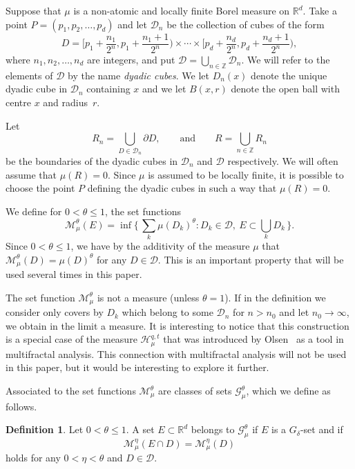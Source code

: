 \documentclass[10pt]{amsart}
\theoremstyle{definition}\newtheorem{defi}[theo]{Definition}\newtheorem{rema}[theo]{Remark}\newtheorem{exam}[theo]{Example}\newtheorem{exem}[theo]{Example}\newtheorem{nota}[theo]{Notation}
\begin{document}
Suppose that $\mu$ is a non-atomic and locally finite Borel measure on $\mathbb{R}^d$. Take a point $P = (p_1, p_2, \ldots, p_d)$ and let $\mathscr{D}_n$ be the collection of cubes of the form
\[
D = \biggl[p_1 + \frac{n_1}{2^n}, p_1 + \frac{n_1 + 1}{2^n} \biggr)
\times \cdots \times \biggl[p_d + \frac{n_d}{2^n}, p_d + \frac{n_d + 1}{2^n} \biggr),
\]
where $n_1, n_2, \ldots, n_d$ are integers, and put $\mathscr{D} =
\bigcup_{n \in \mathbb{Z}} \mathscr{D}_n$. We will refer to the elements of $\mathscr{D}$ by the name {\em dyadic cubes}. We let $D_n (x)$ denote the unique dyadic cube in $\mathscr{D}_n$ containing $x$ and we let $B(x,r)$ denote the open ball with centre $x$ and radius~$r$.

Let
\[
R_n = \bigcup_{D \in \mathscr{D}_n} \partial D, \qquad \text{and} \qquad R = \bigcup_{n \in \mathbb{Z}} R_n
\]
be the boundaries of the dyadic cubes in $\mathscr{D}_n$ and $\mathscr{D}$ respectively. We will often assume that $\mu (R) = 0$. Since $\mu$ is assumed to be locally finite, it is possible to choose the point $P$ defining the dyadic cubes in such a way that $\mu (R) = 0$.

We define for $0 < \theta \leq 1$, the set functions
\[
\mathscr{M}_\mu^\theta (E) = \inf \biggl\{\, \sum_k \mu (D_k)^\theta : D_k \in \mathscr{D},\ E \subset \bigcup_k D_k \,\biggr\}.
\]
Since $0 < \theta \leq 1$, we have by the additivity of the measure $\mu$ that $\mathscr{M}_\mu^\theta (D) = \mu (D)^\theta$ for any $D
\in \mathscr{D}$. This is an important property that will be used several times in this paper.

The set function $\mathscr{M}_\mu^\theta$ is not a measure (unless $\theta = 1$). If in the definition we consider only covers by $D_k$ which belong to some $\mathscr{D}_n$ for $n > n_0$ and let $n_0 \to \infty$, we obtain in the limit a measure. It is interesting to notice that this construction is a special case of the measure $\mathscr{H}_\mu^{q,t}$ that was introduced by Olsen~\cite{olsen} as a tool in multifractal analysis. This connection with multifractal analysis will not be used in this paper, but it would be interesting to explore it further.

Associated to the set functions $\mathscr{M}_\mu^\theta$ are classes of sets $\mathscr{G}_\mu^\theta$, which we define as follows.

\begin{defi}\label{def:class}
Let $0 < \theta \leq 1$. A set $E \subset \mathbb{R}^d$ belongs to $\mathscr{G}_\mu^\theta$ if $E$ is a $G_\delta$-set and if
\[
\mathscr{M}_\mu^\eta (E \cap D) = \mathscr{M}_\mu^\eta (D)
\]
holds for any $0 < \eta < \theta$ and $D \in \mathscr{D}$.
\end{defi}
\end{document}
